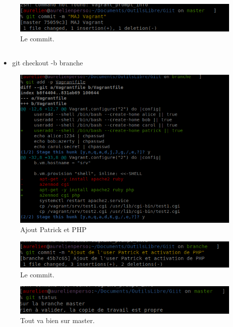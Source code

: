 \documentclass{article}
\begin{document}
\begin{figure}[h]
\centering
\includegraphics[width=0.7\columnwidth]{screen/git2.png}
\caption{\label{fig:frog}Le commit.}
\end{figure}

\subsection{}

\begin{itemize}
    \item git checkout -b branche
\end{itemize}

\begin{figure}[h]
\centering
\includegraphics[width=0.7\columnwidth]{screen/git2_1.png}
\caption{\label{fig:frog}Ajout Patrick et PHP}
\end{figure}

\begin{figure}[h]
\centering
\includegraphics[width=1\columnwidth]{screen/git2_2.png}
\caption{\label{fig:frog}Le commit.}
\end{figure}

\begin{figure}[h]
\centering
\includegraphics[width=0.7\columnwidth]{screen/git2_3.png}
\caption{\label{fig:frog}Tout va bien sur master.}
\end{figure}
\end{document}

